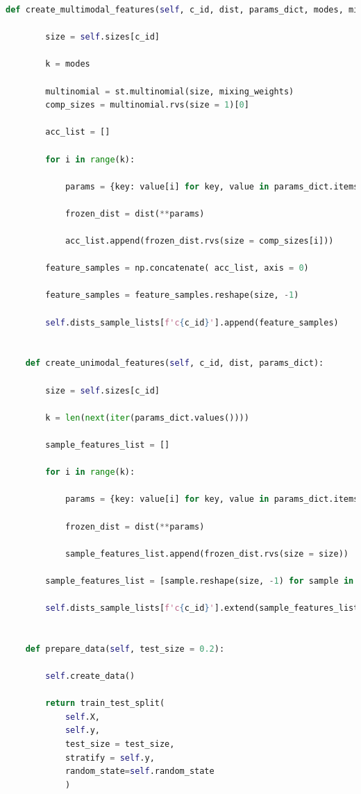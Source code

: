 \begin{lstlisting}[language=Python, numbers=none]
    def create_multimodal_features(self, c_id, dist, params_dict, modes, mixing_weights):

        size = self.sizes[c_id]

        k = modes

        multinomial = st.multinomial(size, mixing_weights)
        comp_sizes = multinomial.rvs(size = 1)[0]

        acc_list = []

        for i in range(k):

            params = {key: value[i] for key, value in params_dict.items()}

            frozen_dist = dist(**params)

            acc_list.append(frozen_dist.rvs(size = comp_sizes[i]))

        feature_samples = np.concatenate( acc_list, axis = 0)

        feature_samples = feature_samples.reshape(size, -1)

        self.dists_sample_lists[f'c{c_id}'].append(feature_samples)
        

    def create_unimodal_features(self, c_id, dist, params_dict):

        size = self.sizes[c_id]

        k = len(next(iter(params_dict.values())))

        sample_features_list = []

        for i in range(k):

            params = {key: value[i] for key, value in params_dict.items()}

            frozen_dist = dist(**params)

            sample_features_list.append(frozen_dist.rvs(size = size))

        sample_features_list = [sample.reshape(size, -1) for sample in sample_features_list]

        self.dists_sample_lists[f'c{c_id}'].extend(sample_features_list)

    
    def prepare_data(self, test_size = 0.2):
        
        self.create_data()

        return train_test_split(
            self.X, 
            self.y, 
            test_size = test_size,
            stratify = self.y,
            random_state=self.random_state
            )
\end{lstlisting}



